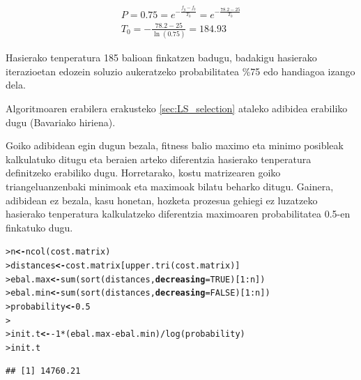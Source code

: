 \documentclass[eu]{ifirak}\usepackage[]{graphicx}\usepackage[]{color}
\makeatletter
\newcommand{\hlnum}[1]{\textcolor[rgb]{0.659,0.4,0.051}{#1}}%
\newcommand{\hlopt}[1]{\textcolor[rgb]{0,0,0}{#1}}%
\newcommand{\hlstd}[1]{\textcolor[rgb]{0,0,0}{#1}}%
\newcommand{\hlkwb}[1]{\textcolor[rgb]{0.549,0.114,0.412}{\textbf{#1}}}%
\newcommand{\hlkwc}[1]{\textcolor[rgb]{0.659,0.573,0.133}{\textbf{#1}}}%
\newcommand{\hlkwd}[1]{\textcolor[rgb]{0.659,0.133,0.482}{#1}}%
\newenvironment{kframe}{%
 \def\at@end@of@kframe{}%
 \ifinner\ifhmode%
  \def\at@end@of@kframe{\end{minipage}}%
  \begin{minipage}{\columnwidth}%
 \fi\fi%
 \def\FrameCommand##1{\hskip\@totalleftmargin \hskip-\fboxsep
 \colorbox{shadecolor}{##1}\hskip-\fboxsep
     \hskip-\linewidth \hskip-\@totalleftmargin \hskip\columnwidth}%
 \MakeFramed {\advance\hsize-\width
   \@totalleftmargin\z@ \linewidth\hsize
   \@setminipage}}%
 {\par\unskip\endMakeFramed%
 \at@end@of@kframe}
\newenvironment{knitrout}{}{} %
\makeatother
\begin{document}
\begin{itemize}
\begin{tcolorbox}
\begin{ifexample}
\begin{align*}
P=0.75= e^{-\frac{f_g-f_b}{T_0}} = e^{-\frac{78.2-25}{T_0}}\\
T_0 = -\frac{78.2-25}{\ln(0.75)} = 184.93
\end{align*}

Hasierako tenperatura 185 balioan finkatzen badugu, badakigu hasierako iterazioetan edozein soluzio aukeratzeko probabilitatea \%75 edo handiagoa izango dela.
\end{ifexample}
\end{tcolorbox}

Algoritmoaren erabilera erakusteko \ref{sec:LS_selection} ataleko adibidea erabiliko dugu (Bavariako hiriena).

\begin{knitrout}
\color{fgcolor}\begin{kframe}


{\ttfamily\noindent\itshape\color{messagecolor}{\#\# Processing file corresponding to instance bays29: 29 cities in Bavaria, street distances (Groetschel,Juenger,Reinelt)}}\end{kframe}
\end{knitrout}

Goiko adibidean egin dugun bezala, fitness balio maximo eta minimo posibleak kalkulatuko ditugu eta beraien arteko diferentzia hasierako tenperatura definitzeko erabiliko dugu. Horretarako, kostu matrizearen goiko triangeluanzenbaki minimoak eta maximoak bilatu beharko ditugu. Gainera, adibidean ez bezala, kasu honetan, hozketa prozesua gehiegi ez luzatzeko hasierako tenperatura kalkulatzeko diferentzia maximoaren probabilitatea 0.5-en finkatuko dugu.

\begin{knitrout}
\color{fgcolor}\begin{kframe}
\begin{alltt}
\hlstd{> }\hlstd{n} \hlkwb{<-} \hlkwd{ncol}\hlstd{(cost.matrix)}
\hlstd{> }\hlstd{distances} \hlkwb{<-} \hlstd{cost.matrix[}\hlkwd{upper.tri}\hlstd{(cost.matrix)]}
\hlstd{> }\hlstd{ebal.max} \hlkwb{<-} \hlkwd{sum}\hlstd{(}\hlkwd{sort}\hlstd{(distances,} \hlkwc{decreasing}\hlstd{=}\hlnum{TRUE}\hlstd{)[}\hlnum{1}\hlopt{:}\hlstd{n])}
\hlstd{> }\hlstd{ebal.min} \hlkwb{<-} \hlkwd{sum}\hlstd{(}\hlkwd{sort}\hlstd{(distances,} \hlkwc{decreasing}\hlstd{=}\hlnum{FALSE}\hlstd{)[}\hlnum{1}\hlopt{:}\hlstd{n])}
\hlstd{> }\hlstd{probability} \hlkwb{<-} \hlnum{0.5}
\hlstd{> }
\hlstd{> }\hlstd{init.t} \hlkwb{<-} \hlopt{-}\hlnum{1} \hlopt{*} \hlstd{(ebal.max} \hlopt{-} \hlstd{ebal.min)} \hlopt{/} \hlkwd{log}\hlstd{(probability)}
\hlstd{> }\hlstd{init.t}
\end{alltt}
\begin{verbatim}
## [1] 14760.21
\end{verbatim}
\end{kframe}
\end{knitrout}


\end{itemize}
\end{document}
